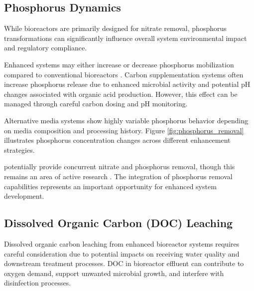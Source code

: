 \documentclass[12pt,a4paper]{article}
\begin{document}
\subsection{Phosphorus Dynamics}

 While bioreactors are primarily designed for nitrate removal, phosphorus transformations can significantly influence overall system environmental impact and regulatory compliance.

Enhanced systems may either increase or decrease phosphorus mobilization compared to conventional bioreactors \citep{RN370, RN291}.  Carbon supplementation systems often increase phosphorus release due to enhanced microbial activity and potential pH changes associated with organic acid production. However, this effect can be managed through careful carbon dosing and pH monitoring.

Alternative media systems show highly variable phosphorus behavior depending on media composition and processing history.  Figure \ref{fig:phosphorus_removal} illustrates phosphorus concentration changes across different enhancement strategies.

 potentially provide concurrent nitrate and phosphorus removal, though this remains an area of active research \citep{RN291}. The integration of phosphorus removal capabilities represents an important opportunity for enhanced system development.

\subsection{Dissolved Organic Carbon (DOC) Leaching}

Dissolved organic carbon leaching from enhanced bioreactor systems requires careful consideration due to potential impacts on receiving water quality and downstream treatment processes.  DOC in bioreactor effluent can contribute to oxygen demand, support unwanted microbial growth, and interfere with disinfection processes.
\end{document}
